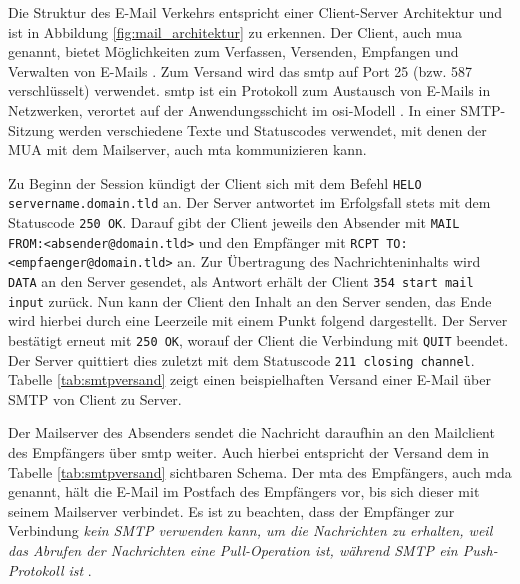 \noindent Die Struktur des E-Mail Verkehrs entspricht einer Client-Server Architektur und ist in Abbildung \ref{fig:mail_architektur} zu erkennen. Der Client, auch \acrfull{mua} genannt, bietet Möglichkeiten zum Verfassen, Versenden, Empfangen und Verwalten von E-Mails \citep[S. 142 f.]{Kurose2014}. Zum Versand wird das \acrfull{smtp} auf Port 25 (bzw. 587 verschlüsselt) verwendet. \acrshort{smtp} ist ein Protokoll zum Austausch von E-Mails in Netzwerken, verortet auf der Anwendungsschicht im \acrshort{osi}-Modell \citep[S. 4 ff.]{RFC5321}. In einer SMTP-Sitzung werden verschiedene Texte und Statuscodes verwendet, mit denen der MUA mit dem Mailserver, auch \acrfull{mta} kommunizieren kann. 

Zu Beginn der Session kündigt der Client sich mit dem Befehl \texttt{HELO} \\ \texttt{servername.domain.tld} an. Der Server antwortet im Erfolgsfall stets mit dem Statuscode \texttt{250 OK}. Darauf gibt der Client jeweils den Absender mit \texttt{MAIL \\ FROM:<absender@domain.tld>} und den Empfänger mit \texttt{RCPT TO:\\<empfaenger@domain.tld>} an. Zur Übertragung des Nachrichteninhalts wird \texttt{DATA} an den Server gesendet, als Antwort erhält der Client \texttt{354 start mail input} zurück. Nun kann der Client den Inhalt an den Server senden, das Ende wird hierbei durch eine Leerzeile mit einem Punkt folgend dargestellt. Der Server bestätigt erneut mit \texttt{250 OK}, worauf der Client die Verbindung mit \texttt{QUIT} beendet. Der Server quittiert dies zuletzt mit dem Statuscode \texttt{211 closing channel}. Tabelle \ref{tab:smtpversand} zeigt einen beispielhaften Versand einer E-Mail über SMTP von Client zu Server. \citep[S. 4 ff.]{RFC821}

Der Mailserver des Absenders sendet die Nachricht daraufhin an den Mailclient des Empfängers über \acrshort{smtp} weiter. Auch hierbei entspricht der Versand dem in Tabelle \ref{tab:smtpversand} sichtbaren Schema. Der \acrshort{mta} des Empfängers, auch \acrfull{mda} genannt, hält die E-Mail im Postfach des Empfängers vor, bis sich dieser mit seinem Mailserver verbindet. Es ist zu beachten, dass der Empfänger zur Verbindung \emph{\glqq[...] kein SMTP verwenden kann, um die Nachrichten zu erhalten, weil das Abrufen der Nachrichten eine Pull-Operation ist, während SMTP ein Push-Protokoll ist\grqq{}} \citep[S. 150]{Kurose2014}.

